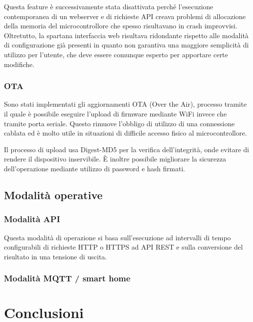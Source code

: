 \documentclass[12pt,a4paper]{report}
\begin{document}
Questa feature è successivamente stata disattivata perché l'esecuzione contemporanea di un webserver e di richieste API creava
problemi di allocazione della memoria del microcontrollore che spesso risultavano in crash improvvisi. Oltretutto, la spartana
interfaccia web risultava ridondante rispetto alle modalità di configurazione già presenti in quanto non garantiva una maggiore
semplicità di utilizzo per l'utente, che deve essere comunque esperto per apportare certe modifiche.

\subsection{OTA}
Sono stati implementati gli aggiornamenti OTA (Over the Air), processo tramite il quale è possibile eseguire l'upload di firmware
mediante WiFi invece che tramite porta seriale. Questo rimuove l'obbligo di utilizzo di una connessione cablata ed è molto utile
in situazioni di difficile accesso fisico al microcontrollore.

Il processo di upload usa Digest-MD5 per la verifica dell'integrità, onde evitare di rendere il dispositivo inservibile. È inoltre possibile
migliorare la sicurezza dell'operazione mediante utilizzo di password e hash firmati. \cite{espota}

\pagebreak
\section{Modalità operative}

\subsection{Modalità API}
Questa modalità di operazione si basa sull'esecuzione ad intervalli di tempo configurabili di richieste HTTP o HTTPS ad API REST
e sulla conversione del risultato in una tensione di uscita.





\subsection{Modalità MQTT / smart home}

\chapter{Conclusioni}
\end{document}
